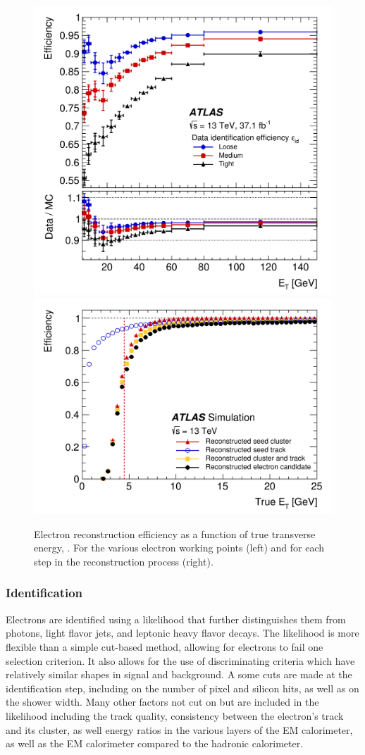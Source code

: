 \begin{figure}[htbp]
\centering
\includegraphics[width=.4\textwidth]{figures/EventReconstruction/elec-reco.png}
\includegraphics[width=.5\textwidth]{figures/EventReconstruction/elec-reco-steps.png}
\caption{Electron reconstruction efficiency as a function of true transverse energy, \et. For the various electron working points (left) and for each step in the reconstruction process (right).}
\label{fig:elec_gsf}
\end{figure}

\subsubsection{Identification}

Electrons are identified using a likelihood that further distinguishes them from photons, light flavor jets, and leptonic heavy flavor decays. The likelihood is more flexible than a simple cut-based method, allowing for electrons to fail one selection criterion. It also allows for the use of discriminating criteria which have relatively similar shapes in signal and background. A some cuts are made at the identification step, including on the number of pixel and silicon hits, as well as on the shower width. Many other factors not cut on but are included in the likelihood including the track quality, consistency between the electron's track and its cluster, as well energy ratios in the various layers of the \ac{EM} calorimeter, as well as the \ac{EM} calorimeter compared to the hadronic calorimeter.


